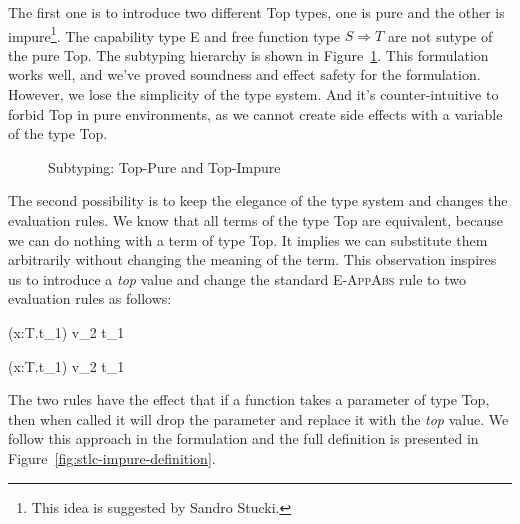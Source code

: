 The first one is to introduce two different Top types, one is pure and
the other is impure\footnote{This idea is suggested by Sandro
  Stucki.}. The capability type E and free function type
$S \Rightarrow T$ are not sutype of the pure Top. The subtyping
hierarchy is shown in
Figure~\ref{fig:stlc-impure-subtyping-tree}. This formulation works
well, and we've proved soundness and effect safety for the
formulation. However, we lose the simplicity of the type system. And
it's counter-intuitive to forbid Top in pure environments, as we
cannot create side effects with a variable of the type Top.

\begin{figure}
\centering


\caption{Subtyping: Top-Pure and Top-Impure}
\label{fig:stlc-impure-subtyping-tree}
\end{figure}

The second possibility is to keep the elegance of the type system and
changes the evaluation rules. We know that all terms of the type Top
are equivalent, because we can do nothing with a term of type Top. It
implies we can substitute them arbitrarily without changing the
meaning of the term. This observation inspires us to introduce a
\emph{top} value and change the standard \textsc{E-AppAbs} rule to two
evaluation rules as follows:

{ (\lambda x:T.t_1) v_2 \longrightarrow [x \mapsto v_2]t_1 }

{ (\lambda x:T.t_1) v_2 t_1 }

The two rules have the effect that if a function takes a parameter of
type Top, then when called it will drop the parameter and replace it
with the \emph{top} value. We follow this approach in the formulation
and the full definition is presented in
Figure~\ref{fig:stlc-impure-definition}.

